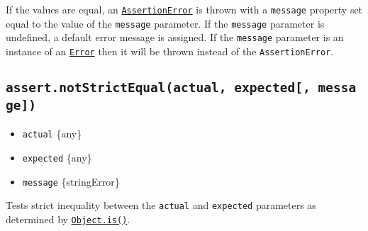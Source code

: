 \begin{Shaded}
\begin{Highlighting}[]
\OperatorTok{=} \NormalTok{(}\NormalTok{)}\OperatorTok{;}

\NormalTok{(}\OperatorTok{,} \NormalTok{)}\OperatorTok{;}

\NormalTok{(}\OperatorTok{,} \NormalTok{)}\OperatorTok{;}

\NormalTok{(}\OperatorTok{,} \StringTok{\textquotesingle{}1\textquotesingle{}}\NormalTok{)}\OperatorTok{;}
\end{Highlighting}
\end{Shaded}

If the values are equal, an
\hyperref[class-assertassertionerror]{\texttt{AssertionError}} is thrown
with a \texttt{message} property set equal to the value of the
\texttt{message} parameter. If the \texttt{message} parameter is
undefined, a default error message is assigned. If the \texttt{message}
parameter is an instance of an
\href{errors.md\#class-error}{\texttt{Error}} then it will be thrown
instead of the \texttt{AssertionError}.

\subsection{\texorpdfstring{\texttt{assert.notStrictEqual(actual,\ expected{[},\ message{]})}}{assert.notStrictEqual(actual, expected{[}, message{]})}}\label{assert.notstrictequalactual-expected-message}

\begin{itemize}
\tightlist
\item
  \texttt{actual} \{any\}
\item
  \texttt{expected} \{any\}
\item
  \texttt{message} \{string\textbar Error\}
\end{itemize}

Tests strict inequality between the \texttt{actual} and
\texttt{expected} parameters as determined by
\href{https://developer.mozilla.org/en-US/docs/Web/JavaScript/Reference/Global_Objects/Object/is}{\texttt{Object.is()}}.

